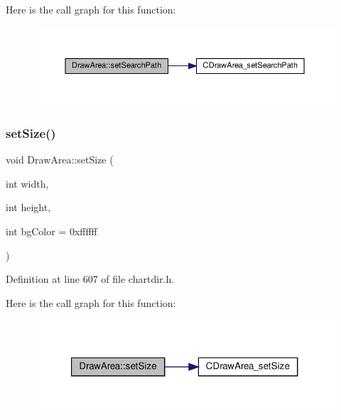 Here is the call graph for this function\+:
\nopagebreak
\begin{figure}[H]
\begin{center}
\leavevmode
\includegraphics[width=350pt]{class_draw_area_ac5eedef9ea6349bdd1d495a7b59cb104_cgraph}
\end{center}
\end{figure}
\mbox{\label{class_draw_area_a3ae25c8fccbbbd77bc6cf2ace5274245}} 
\subsubsection{\texorpdfstring{set\+Size()}{setSize()}}
{\footnotesize\ttfamily void Draw\+Area\+::set\+Size (\begin{DoxyParamCaption}\item[{int}]{width,  }\item[{int}]{height,  }\item[{int}]{bg\+Color = {\ttfamily 0xffffff} }\end{DoxyParamCaption})\hspace{0.3cm}{\ttfamily [inline]}}



Definition at line 607 of file chartdir.\+h.

Here is the call graph for this function\+:
\nopagebreak
\begin{figure}[H]
\begin{center}
\leavevmode
\includegraphics[width=321pt]{class_draw_area_a3ae25c8fccbbbd77bc6cf2ace5274245_cgraph}
\end{center}
\end{figure}
\mbox{\label{class_draw_area_a454536e57a331ef65bbf51b30255b5d3}} 

